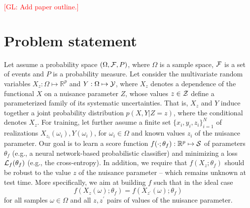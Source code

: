 \documentclass[twocolumn,superscriptaddress,aps]{revtex4-1}
\newcommand{\glnote}[1]{\textcolor{red}{[GL: #1]}}
\theoremstyle{plain}
\begin{document}
\glnote{Add paper outline.}


\section{Problem statement}
\label{sec:problem}

Let assume a probability space $(\Omega, {\cal F}, P)$, where $\Omega$ is a
sample space, ${\cal F}$ is a set of events and $P$ is a probability measure.
Let consider the multivariate random variables $X_z: \Omega \mapsto
\mathbb{R}^p$ and $Y: \Omega \mapsto {\cal Y}$, where $X_z$ denotes a dependence
of the functional $X$ on a nuisance parameter $Z$, whose values $z \in {\cal Z}$  define a
parameterized family of its systematic uncertainties. That is, $X_z$ and $Y$
induce together a joint probability distribution $p(X,Y|Z=z)$, where the
conditional denotes $X_z$. For training, let further assume a finite set $\{
x_i, y_i, z_i \}_{i=1}^N$ of realizations $X_{z_i}(\omega_i), Y(\omega_i)$, for
$\omega_i \in \Omega$ and known values $z_i$ of the nuisance parameter. Our goal
is to learn a score function $f(\cdot;\theta_f) : \mathbb{R}^p \mapsto {\cal S}$ of
parameters $\theta_f$ (e.g., a neural network-based probabilistic classifier) and minimizing  a loss ${\cal L}_f(\theta_f)$ (e.g.,
the cross-entropy). In addition, we require that $f(X_z ; \theta_f)$ should be
robust to the value $z$ of the nuisance parameter  -- which remains unknown at
test time. More specifically, we aim at building $f$ such that in the ideal case
\begin{equation}\label{eqn:criterion-true}
f(X_{z}(\omega) ; \theta_f) = f(X_{z^\prime}(\omega) ; \theta_f)
\end{equation} for all
samples $\omega \in \Omega$ and all $z, z^\prime$ pairs of values of the
nuisance parameter.
\end{document}

